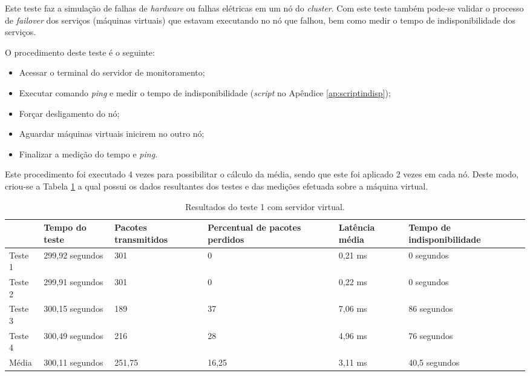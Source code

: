 Este teste faz a simulação de falhas de \textit{hardware} ou falhas elétricas em um nó do \textit{cluster}. Com este teste também pode-se 
validar o processo de \textit{failover} dos serviços (máquinas virtuais) que estavam executando no nó que falhou, bem como medir o tempo de 
indisponibilidade dos serviços.

O procedimento deste teste é o seguinte:
\begin{itemize}
 \item Acessar o terminal do servidor de monitoramento;
 \item Executar comando \textit{ping} e medir o tempo de indisponibilidade (\textit{script} no Apêndice \ref{ap:scriptindisp});
 \item Forçar desligamento do nó;
 \item Aguardar máquinas virtuais inicirem no outro nó;
 \item Finalizar a medição do tempo e \textit{ping}.
\end{itemize}

Este procedimento foi executado 4 vezes para possibilitar o cálculo da média, sendo que este foi aplicado 2 vezes em cada nó. Deste modo, 
criou-se a Tabela \ref{tab:teste1resultadosvirt} a qual possui os dados resultantes dos testes e das medições efetuada sobre a máquina virtual.

\begin{table}[h!]
\caption{Resultados do teste 1 com servidor virtual.}
\label{tab:teste1resultadosvirt}
\begin{center}
\begin{tabular}{|l|p{2.3cm}|p{2.2cm}|p{2.5cm}|p{2cm}|p{2.7cm}|}\hline
 & \textbf{Tempo do teste} & \textbf{Pacotes transmitidos} & \textbf{Percentual de pacotes perdidos} & \textbf{Latência média} & \textbf{Tempo de indisponibilidade} \\\hline
Teste 1 & 299,92 segundos & 301 & 0 & 0,21 ms & 0 segundos \\\hline
Teste 2 & 299,91 segundos & 301 & 0 & 0,22 ms & 0 segundos \\\hline
Teste 3 & 300,15 segundos & 189 & 37 & 7,06 ms & 86 segundos \\\hline
Teste 4 & 300,49 segundos & 216 & 28 & 4,96 ms & 76 segundos \\\hline
Média & 300,11 segundos & 251,75 & 16,25 & 3,11 ms & 40,5 segundos \\\hline
\end{tabular}
\end{center}
\end{table}


